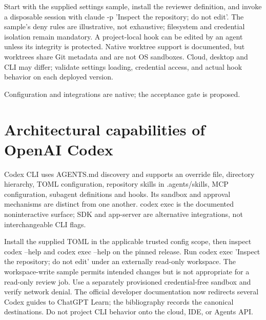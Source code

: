 \documentclass[11pt,letterpaper]{article}
\begin{document}
Start with the supplied settings sample, install the reviewer definition, and invoke a disposable session with claude -p 'Inspect the repository; do not edit'. The sample's deny rules are illustrative, not exhaustive; filesystem and credential isolation remain mandatory. A project-local hook can be edited by an agent unless its integrity is protected. Native worktree support is documented, but worktrees share Git metadata and are not OS sandboxes. Cloud, desktop and CLI may differ; validate settings loading, credential access, and actual hook behavior on each deployed version. \cite{cwork,ccloud}

\begin{center}\begin{minipage}{\linewidth}\captionsetup{type=figure}\centering{}\caption{Claude Code extension architecture}
\small Configuration and integrations are native; the acceptance gate is proposed.\end{minipage}\end{center}
\section{Architectural capabilities of OpenAI Codex}
Codex CLI uses AGENTS.md discovery and supports an override file, directory hierarchy, TOML configuration, repository skills in .agents/skills, MCP configuration, subagent definitions and hooks. Its sandbox and approval mechanisms are distinct from one another. codex exec is the documented noninteractive surface; SDK and app-server are alternative integrations, not interchangeable CLI flags. \cite{oagents,oconfig,oskills,omcp,osub,ohooks,oexec,osec,oplatform}

Install the supplied TOML in the applicable trusted config scope, then inspect codex --help and codex exec --help on the pinned release. Run codex exec 'Inspect the repository; do not edit' under an externally read-only workspace. The workspace-write sample permits intended changes but is not appropriate for a read-only review job. Use a separately provisioned credential-free sandbox and verify network denial. The official developer documentation now redirects several Codex guides to ChatGPT Learn; the bibliography records the canonical destinations. Do not project CLI behavior onto the cloud, IDE, or Agents API.
\end{document}
